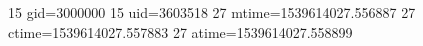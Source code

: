 15 gid=3000000
15 uid=3603518
27 mtime=1539614027.556887
27 ctime=1539614027.557883
27 atime=1539614027.558899
